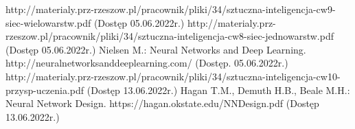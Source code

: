 \documentclass[12pt,twoside]{article}
\begin{document}
\clearpage


\begin{thebibliography}{4}
	 http://materialy.prz-rzeszow.pl/pracownik/pliki/34/sztuczna-inteligencja-cw9-siec-wielowarstw.pdf (Dostęp 05.06.2022r.)
	 http://materialy.prz-rzeszow.pl/pracownik/pliki/34/sztuczna-inteligencja-cw8-siec-jednowarstw.pdf (Dostęp 05.06.2022r.)
	 Nielsen M.: Neural Networks and Deep Learning. http://neuralnetworksanddeeplearning.com/ (Dostęp. 05.06.2022r.)
	 http://materialy.prz-rzeszow.pl/pracownik/pliki/34/sztuczna-inteligencja-cw10-przysp-uczenia.pdf (Dostęp 13.06.2022r.)
	 Hagan T.M., Demuth H.B., Beale M.H.: Neural Network Design. https://hagan.okstate.edu/NNDesign.pdf (Dostęp 13.06.2022r.)
\end{thebibliography}

\clearpage

\makesummary
\end{document}
